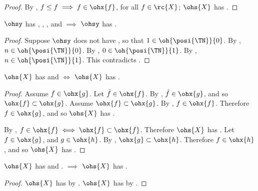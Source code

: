 \documentclass[b5paper, english, oneside]{memoir}
\begin{document}
\begin{proof}
By , $f \leq f \implies f \in \ohx{f}$, for all $f \in \rc{X}$; $\ohs{X}$ has . 
\end{proof}

\begin{proposition}
\label{ZeroSeparationIsImplied}
$\ohsy$ has , , , and  $\implies$ $\ohsy$ has .
\end{proposition}

\begin{proof}
Suppose $\ohsy$ does not have , so that $1 \in \oh{\posi{\TN}}{0}$. By , $n \in \oh{\posi{\TN}}{0}$. By , $0 \in \oh{\posi{\TN}}{1}$. By , $n \in \oh{\posi{\TN}}{1}$. This contradicts . 
\end{proof}

\begin{proposition}
\label{ReflexiveTransitiveIsOrderness}
$\ohs{X}$ has  and  $\iff$ $\ohs{X}$ has .
\end{proposition}

\begin{proof}
\proofpart{$\implies$} 
Assume $f \in \ohx{g}$. Let $\hat{f} \in \ohx{f}$. By , $\hat{f} \in \ohx{g}$, and so $\ohx{f} \subset \ohx{g}$. Assume $\ohx{f} \subset \ohx{g}$. By , $f \in \ohx{f}$. Therefore $f \in \ohx{g}$, and so $\ohs{X}$ has . 

\proofpart{$\impliedby$} 
By , $f \in \ohx{f} \iff \ohx{f} \subset \ohx{f}$. Therefore $\ohs{X}$ has . Let $f \in \ohx{g}$, and $g \in \ohx{h}$. By , $\ohx{g} \subset \ohx{h}$. Therefore $f \in \ohx{h}$, and so $\ohs{X}$ has .
\end{proof}

\begin{proposition}
\label{OrdernessIsImplied}
$\ohs{X}$ has  and . $\implies$ $\ohs{X}$ has .
\end{proposition}

\begin{proof}
$\ohs{X}$ has  by . $\ohs{X}$ has  by .
\end{proof}
\end{document}
